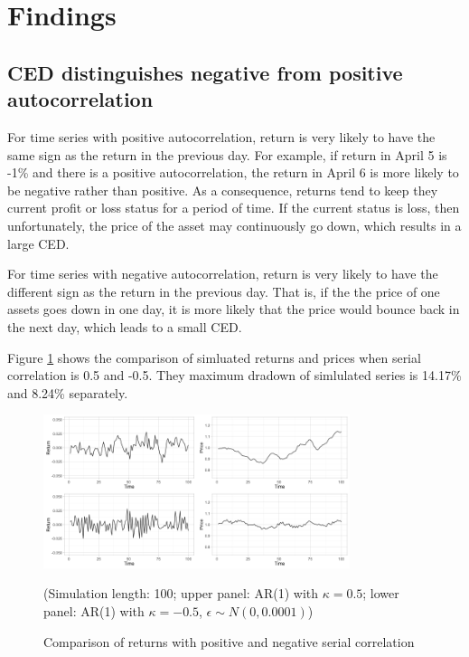 \documentclass[11pt]{article}
\begin{document}
\section{Findings}  %

\subsection{CED distinguishes negative from positive autocorrelation}

For time series with positive autocorrelation, return is very likely to have the same sign as the return in the previous day. For example, if return in April 5 is -1\% and there is a positive autocorrelation, the return in April 6 is more likely to be negative rather than positive. As a consequence, returns tend to keep they current profit or loss status for a period of time. If the current status is loss, then unfortunately, the price of the asset may continuously go down, which results in a large CED.

For time series with negative autocorrelation, return is very likely to have the different sign as the return in the previous day. That is, if the the price of one assets goes down in one day, it is more likely that the price would bounce back in the next day, which leads to a small CED. 

Figure \ref{fig:Comparison_pos_neg_autocorrelation} shows the comparison of simluated returns and prices when serial correlation is 0.5 and -0.5. They maximum dradown of simlulated series is 14.17\% and 8.24\% separately. 

\begin{figure}[H]
\centering
\includegraphics[width = 0.8\textwidth]{../figures/simulation/Comparison_pos_neg_autocorrelation}
\caption{Comparison of returns with positive and negative serial correlation}
(Simulation length: 100; upper panel: AR(1) with $\kappa=0.5$; lower panel: AR(1) with $\kappa=-0.5$, $\epsilon\sim N(0, 0.0001)$)
\label{fig:Comparison_pos_neg_autocorrelation}
\end{figure}
\end{document}
